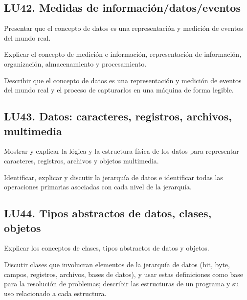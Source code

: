\subsection{LU42. Medidas de información/datos/eventos}\label{sec:BOK-LU42}\label{sec:LU42}
\begin{LearningUnit}
\begin{LUGoal}
\item Presentar que el concepto de datos es una representación y medición de eventos del mundo real.
\end{LUGoal}

\begin{LUObjective}
\item Explicar el concepto de medición e información, representación de información, organización, almacenamiento y procesamiento.
\item Describir que el concepto de datos es una representación y medición de eventos del mundo real y el proceso de capturarlos en una máquina de forma legible.
\end{LUObjective}
\end{LearningUnit}

\subsection{LU43. Datos: caracteres, registros, archivos, multimedia}\label{sec:BOK-LU43}\label{sec:LU43}
\begin{LearningUnit}
\begin{LUGoal}
\item Mostrar y explicar la lógica y la estructura física de los datos para representar caracteres, registros, archivos y objetos multimedia.
\end{LUGoal}

\begin{LUObjective}
\item Identificar, explicar y discutir la jerarquía de datos e identificar todas las operaciones primarias asociadas con cada nivel de la jerarquía.
\end{LUObjective}
\end{LearningUnit}

\subsection{LU44. Tipos abstractos de datos, clases, objetos}\label{sec:BOK-LU44}\label{sec:LU44}
\begin{LearningUnit}
\begin{LUGoal}
\item Explicar los conceptos de clases, tipos abstractos de datos y objetos.
\end{LUGoal}

\begin{LUObjective}
\item Discutir clases que involucran elementos de la jerarquía de datos (bit, byte, campos, registros, archivos, bases de datos), y usar estas definiciones como base para la resolución de problemas; describir las estructuras de un programa y su uso relacionado a cada estructura.
\end{LUObjective}
\end{LearningUnit}

